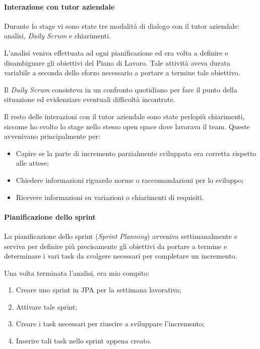 \paragraph{Interazione con tutor aziendale} \mbox{}

Durante lo stage vi sono state tre modalità di dialogo con il tutor aziendale:
analisi, \emph{Daily Scrum} e chiarimenti.

L'analisi veniva effettuata ad ogni pianificazione ed era volta a definire e
disambiguare gli obiettivi del Piano di Lavoro. Tale attività aveva durata
variabile a seconda dello sforzo necessario a portare a termine tale obiettivo.

Il \emph{Daily Scrum} consisteva in un confronto quotidiano per fare il punto
della situazione ed evidenziare eventuali difficoltà incontrate.

Il resto delle interazioni con il tutor aziendale sono state perlopiù
chiarimenti, siccome ho svolto lo stage nello stesso open space dove lavorava
il team. Queste avvenivano principalmente per:

\begin{itemize}
\item Capire se la parte di incremento parzialmente sviluppata era corretta
  rispetto alle attese;
\item Chiedere informazioni riguardo norme o raccomandazioni per lo sviluppo;
\item Ricevere informazioni su variazioni o chiarimenti di requisiti.
\end{itemize}

\paragraph{Pianificazione dello sprint} \mbox{}

La pianificazione dello sprint (\emph{Sprint Planning}) avveniva
settimanalmente e serviva per definire più precisamente gli obiettivi da portare a termine e determinare i vari task da svolgere necessari per
completare un incremento.

Una volta terminata l'analisi, era mio compito:

\begin{enumerate}
\item Creare uno sprint in JPA per la settimana lavorativa;
\item Attivare tale sprint;
\item Creare i task necessari per riuscire a sviluppare l'incremento;
\item Inserire tali task nello sprint appena creato.
\end{enumerate}

